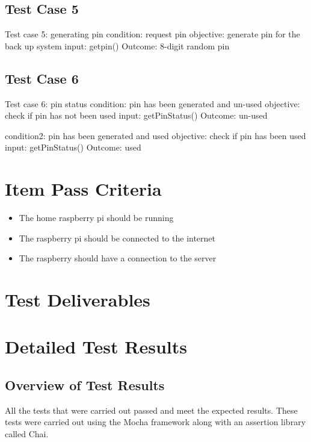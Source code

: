 \documentclass[a4paper,12pt]{article}
\begin{document}
		\subsection{Test Case 5}
		Test case 5: generating pin \newline
		condition: request pin \newline
		objective: generate pin for the back up system \newline
		input: getpin() \newline
		Outcome: 8-digit random pin \newline
		
		\subsection{Test Case 6}
		Test case 6: pin status \newline
		condition: pin has been generated and un-used \newline
		objective: check if pin has not been used \newline
		input: getPinStatus() \newline
		Outcome: un-used \newline
	
		condition2: pin has been generated and used
		objective: check if pin has been used
		input: getPinStatus()
		Outcome: used
		
	\section{Item Pass Criteria}
		\begin{itemize}
			\item The home raspberry pi should be running
			\item The raspberry pi should be connected to the internet
			\item The raspberry should have a connection to the server
		\end{itemize}
		
	\section{Test Deliverables}
	
	\section{Detailed Test Results}
		\subsection{Overview of Test Results}
		All the tests that were carried out passed and meet the expected results. These tests were carried out using the Mocha framework along with an assertion library called Chai.
		
\end{document}
